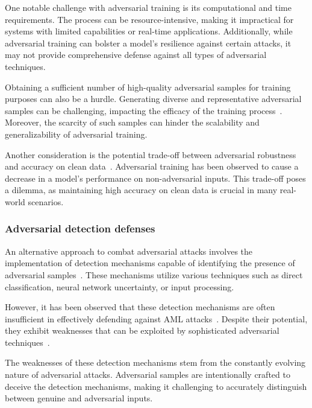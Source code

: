 One notable challenge with adversarial training is its computational and time requirements.
The process can be resource-intensive, making it impractical for systems with limited capabilities or real-time
applications.
Additionally, while adversarial training can bolster a model's resilience against certain attacks, it may not provide
comprehensive defense against all types of adversarial techniques.

Obtaining a sufficient number of high-quality adversarial samples for training purposes can also be a hurdle.
Generating diverse and representative adversarial samples can be challenging, impacting the efficacy of the training
process~\cite{bai2021recent}.
Moreover, the scarcity of such samples can hinder the scalability and generalizability of adversarial training.

Another consideration is the potential trade-off between adversarial robustness and accuracy on clean
data~\cite{bai2021recent}.
Adversarial training has been observed to cause a decrease in a model's performance on non-adversarial inputs.
This trade-off poses a dilemma, as maintaining high accuracy on clean data is crucial in many real-world scenarios.


\subsubsection{Adversarial detection defenses}\label{subsubsec:adversarial-detection-defenses}

An alternative approach to combat adversarial attacks involves the implementation of detection mechanisms capable of
identifying the presence of adversarial samples~\cite{zizzo2019adversarial}.
These mechanisms utilize various techniques such as direct classification, neural network uncertainty, or input
processing.

However, it has been observed that these detection mechanisms are often insufficient in effectively defending against
AML attacks~\cite{zizzo2019adversarial}.
Despite their potential, they exhibit weaknesses that can be exploited by sophisticated adversarial
techniques~\cite{athalye2018obfuscated}.

The weaknesses of these detection mechanisms stem from the constantly evolving nature of adversarial attacks.
Adversarial samples are intentionally crafted to deceive the detection mechanisms, making it challenging to accurately
distinguish between genuine and adversarial inputs.